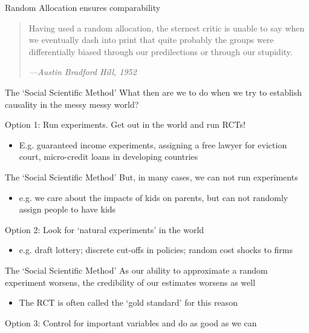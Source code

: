 \documentclass[aspectratio=169,t,11pt,table]{beamer}
\begin{document}
\begin{frame}{Random Allocation ensures comparability}
  \bigskip
  \begin{quote}
    Having used a random allocation, the sternest critic is unable to say when we eventually dash into print that quite probably the groups were differentially biased through our predilections or through our stupidity.

    \emph{—Austin Bradford Hill, 1952}
  \end{quote}
\end{frame}

\begin{frame}{The `Social Scientific Method'}
  What then are we to do when we try to establish causality in the messy messy world?

  \bigskip
  {\color{magenta} Option 1}: Run experiments. Get out in the world and run RCTs! 
  \begin{itemize}
    \item E.g. guaranteed income experiments, assigning a free lawyer for eviction court, micro-credit loans in developing countries
  \end{itemize}
\end{frame}

\begin{frame}{The `Social Scientific Method'}
  But, in many cases, we can not run experiments
  \begin{itemize}
    \item e.g. we care about the impacts of kids on parents, but can not randomly assign people to have kids
  \end{itemize}

  \bigskip
  {\color{magenta} Option 2}: Look for `natural experiments' in the world
  \begin{itemize}
    \item e.g. draft lottery; discrete cut-offs in policies; random cost shocks to firms
  \end{itemize}
\end{frame}

\begin{frame}{The `Social Scientific Method'}
  As our ability to approximate a random experiment worsens, the credibility of our estimates worsens as well
  \begin{itemize}
    \item The RCT is often called the `gold standard' for this reason
  \end{itemize}

  \bigskip
  {\color{magenta} Option 3}: Control for important variables and do as good as we can
\end{frame}
\end{document}

